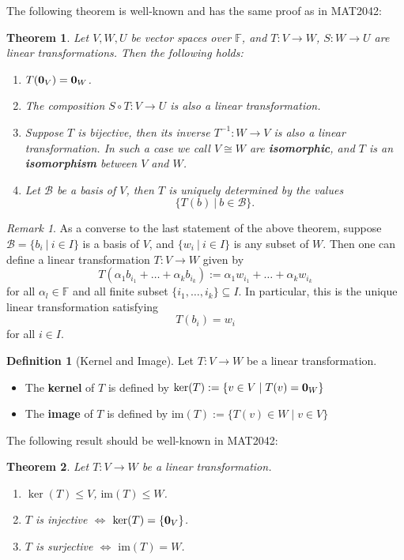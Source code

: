 \documentclass[11pt,openany]{book}
\theoremstyle{plain}
\newtheorem{theorem}{Theorem}[chapter]
\theoremstyle{definition}
\newtheorem{definition}[definition]{Definition}
\theoremstyle{remark}
\newtheorem{remark}[remark]{Remark}
\begin{document}
The following theorem is well-known and has the same proof as in MAT2042:
\begin{theorem}
    Let $V, W, U$ be vector spaces over $\mathbb{F}$, and $T:V \to W$, $S: W \to U$ are linear transformations. Then the following holds:
    \begin{enumerate}
        \item $T({\bf 0}_V) = {\bf 0}_W$.
        \item The composition $S \circ T: V \to U$ is also a linear transformation.
        \item Suppose $T$ is bijective, then its inverse $T^{-1}: W \to V$ is also a linear transformation. In such a case we call $V \cong W$ are {\bf isomorphic}, and $T$ is an {\bf isomorphism} between $V$ and $W$.
        \item Let $\mathcal{B}$ be a basis of $V$, then $T$ is uniquely determined by the values 
        $$\{T(b)\ |\ b \in \mathcal{B}\}.$$
    \end{enumerate}
\end{theorem}

\begin{remark} \label{rmk-basislineartrans}
As a converse to the last statement of the above theorem, suppose $\mathcal{B} = \{ b_i\ |\ i \in I\}$ is a basis of $V$, and $\{w_i\ |\ i \in I\}$ is any subset of $W$. Then one can define a linear transformation
$T:V \to W$ given by
$$T(\alpha_1b_{i_1} + \dots + \alpha_kb_{i_k}) := \alpha_1w_{i_1} + \dots + \alpha_kw_{i_k}$$
for all $\alpha_l \in \mathbb{F}$ and all finite subset $\{i_1,\dots,i_k\} \subseteq I$. In particular, this is the unique linear transformation satisfying
$$T(b_i) = w_i$$
for all $i \in I$.
\end{remark}

\begin{definition}[Kernel and Image]
    Let $T: V \to W$ be a linear transformation.
    \begin{itemize}
        \item The {\bf kernel} of $T$ is defined by  $ \ker(T) := \{ v \in V \mid T(v) = {\bf 0}_W \} $
        \item The {\bf image} of $T$ is defined by $ \text{im}(T) := \{ T(v) \in W \mid v \in V \} $
    \end{itemize}
\end{definition}

The following result should be well-known in MAT2042:
\begin{theorem}
Let $T:V \to W$ be a linear transformation.
\begin{enumerate}
    \item $\ker(T) \leq V$, $\mathrm{im}(T) \leq W$.
    \item $T$ is injective $\iff$ $\ker(T) = \{{\bf 0}_V\}$.
    \item $T$ is surjective $\iff$ $\mathrm{im}(T) = W$.
\end{enumerate}
\end{theorem}
\end{document}
